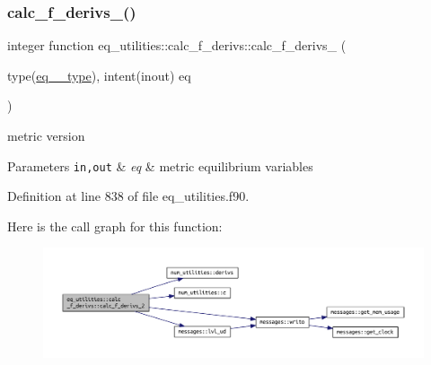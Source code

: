 \subsubsection{\texorpdfstring{calc\+\_\+f\+\_\+derivs\+\_()}{calc\_f\_derivs\_2()}}
{\footnotesize\ttfamily integer function eq\+\_\+utilities\+::calc\+\_\+f\+\_\+derivs\+::calc\+\_\+f\+\_\+derivs\+\_ (\begin{DoxyParamCaption}\item[{type(\hyperlink{structeq__vars_1_1eq__2__type}{eq\+\_\+2\+\_\+type}), intent(inout)}]{eq }\end{DoxyParamCaption})}



metric version 


\begin{DoxyParams}[1]{Parameters}
\mbox{\tt in,out}  & {\em eq} & metric equilibrium variables \\
\hline
\end{DoxyParams}


Definition at line 838 of file eq\+\_\+utilities.\+f90.

Here is the call graph for this function\+:\nopagebreak
\begin{figure}[H]
\begin{center}
\leavevmode
\includegraphics[width=350pt]{interfaceeq__utilities_1_1calc__f__derivs_a95c9a588dab233aef66c5c9abd22dbdf_cgraph}
\end{center}
\end{figure}


